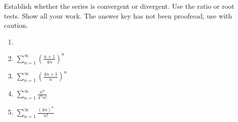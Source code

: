 Establish whether the series is convergent or divergent. Use the ratio or root tests. Show all your work. The answer key has not been proofread, use with caution.
\begin{enumerate}
\item \label{problemConvergenceSum n=0 ^ infty (-1)^n n^2 3^(-n)}

\item $\displaystyle \sum \limits_{n=1}^{\infty} \left( \frac{ n+1 }{4n}\right)^n$
\item $\displaystyle \sum\limits_{n=1}^{\infty}\left(\frac{4n+1 }{n}\right)^n$
\item $\displaystyle \sum\limits_{n=1}^{\infty} \frac{n^n }{4^n n!}$
\item \label{problemConvergenceSum_n=1^infty(4n)^n/nfactorial} $\displaystyle \sum\limits_{n=1}^{\infty} \frac{(4n)^n }{ n!}$
\end{enumerate}
